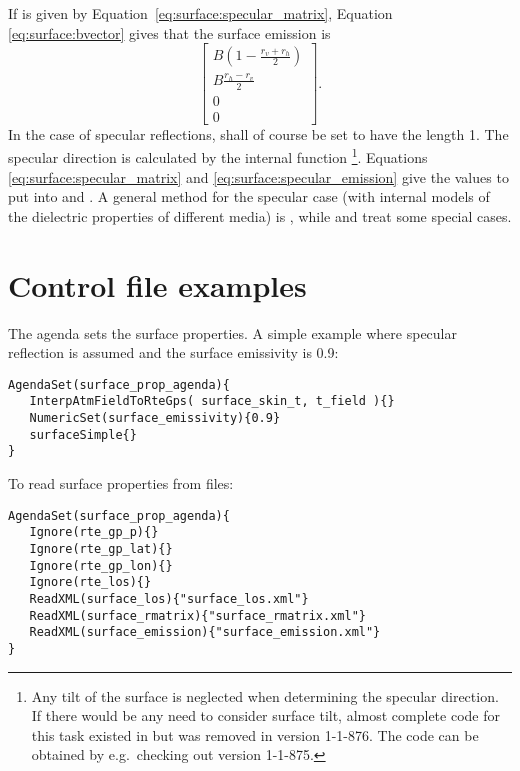 If  is given by Equation~\ref{eq:surface:specular_matrix},
Equation \ref{eq:surface:bvector} gives that the surface emission  is
\begin{equation}
  \label{eq:surface:specular_emission}
   \left[\begin{array}{c}
     B\left(1-\frac{r_v+r_h}{2}\right) \\
     B\frac{r_h-r_v}{2} \\
     0\\0
   \end{array}\right].
\end{equation}
In the case of specular reflections,  shall of
course be set to have the length 1. The specular direction is
calculated by the internal function
\footnote{Any tilt of the surface is
  neglected when determining the specular direction. If there would be
  any need to consider surface tilt, almost complete code for this
  task existed in  but was removed
  in version 1-1-876. The code can be obtained by e.g.\ checking out
  version 1-1-875.}.  Equations \ref{eq:surface:specular_matrix} and
\ref{eq:surface:specular_emission} give the values to put into
 and . A
general method for the specular case (with internal models of the
dielectric properties of different media) is ,
while  and
 treat some special cases.



\section{Control file examples}
\label{sec:surface:cfile}

The agenda  sets the surface properties.
A simple example where specular reflection is assumed and the surface 
emissivity is 0.9:
\begin{verbatim}
AgendaSet(surface_prop_agenda){
   InterpAtmFieldToRteGps( surface_skin_t, t_field ){}
   NumericSet(surface_emissivity){0.9}
   surfaceSimple{}
}

\end{verbatim}
To read surface properties from files:
\begin{verbatim}
AgendaSet(surface_prop_agenda){
   Ignore(rte_gp_p){}
   Ignore(rte_gp_lat){}
   Ignore(rte_gp_lon){}
   Ignore(rte_los){}
   ReadXML(surface_los){"surface_los.xml"}
   ReadXML(surface_rmatrix){"surface_rmatrix.xml"}
   ReadXML(surface_emission){"surface_emission.xml"}
}
\end{verbatim}



 



